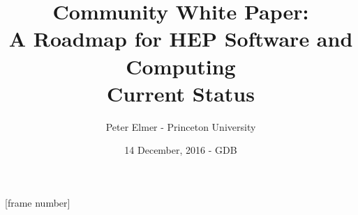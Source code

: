 \documentclass{beamer}
\title{Community White Paper: \\
       A Roadmap for HEP Software and Computing \\
       Current Status}
\author{Peter Elmer - Princeton University}
\date{14 December, 2016 - GDB}
\begin{document}
\maketitle

%
%

[frame number]

%

%

%

%

%
%
%
%




%


%
%
%

%
%










%




%




%








%
\end{document}
